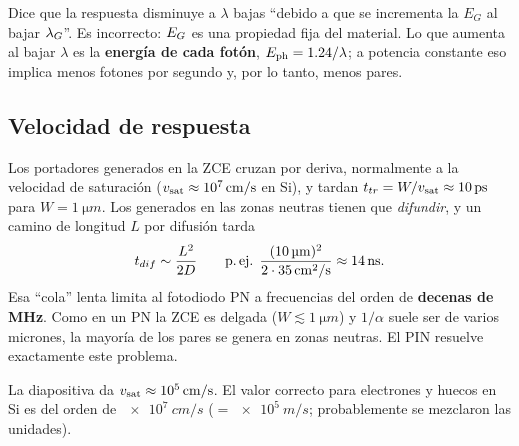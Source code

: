 \begin{ojo}[\diapo{9}]
Dice que la respuesta disminuye a $\lambda$ bajas ``debido a que se incrementa la $E_G$ al
bajar $\lambda_G$''. Es incorrecto: $E_G$ es una propiedad fija del material. Lo que aumenta
al bajar $\lambda$ es la \textbf{energía de cada fotón}, $E_{\mathrm{ph}}=1.24/\lambda$; a potencia
constante eso implica menos fotones por segundo y, por lo tanto, menos pares.
\end{ojo}

\subsection{Velocidad de respuesta}
\label{sec:pn-velocidad}

Los portadores generados en la ZCE cruzan por deriva, normalmente a la velocidad de
saturación ($v_{\mathrm{sat}}\approx\SI{e7}{cm/s}$ en Si), y tardan
$t_{tr}=W/v_{\mathrm{sat}}\approx\SI{10}{ps}$ para $W=\SI{1}{\micro m}$. Los generados en las zonas
neutras tienen que \emph{difundir}, y un camino de longitud $L$ por difusión tarda
\[
  t_{dif}\sim\frac{L^2}{2D}\qquad
  \text{p.\,ej. } \frac{(\SI{10}{\micro m})^2}{2\cdot\SI{35}{cm^2/s}}\approx\SI{14}{ns}.
\]
Esa ``cola'' lenta limita al fotodiodo PN a frecuencias del orden de
\textbf{decenas de MHz}. Como en un PN la ZCE es delgada ($W\lesssim\SI{1}{\micro m}$) y
$1/\alpha$ suele ser de varios micrones, la mayoría de los pares se genera en zonas
neutras. El PIN resuelve exactamente este problema.

\begin{ojo}
La diapositiva da $v_{\mathrm{sat}}\approx\SI{e5}{cm/s}$. El valor correcto para electrones y huecos
en Si es del orden de $\SI{e7}{cm/s}$ ($=\SI{e5}{m/s}$; probablemente se mezclaron las
unidades).
\end{ojo}

